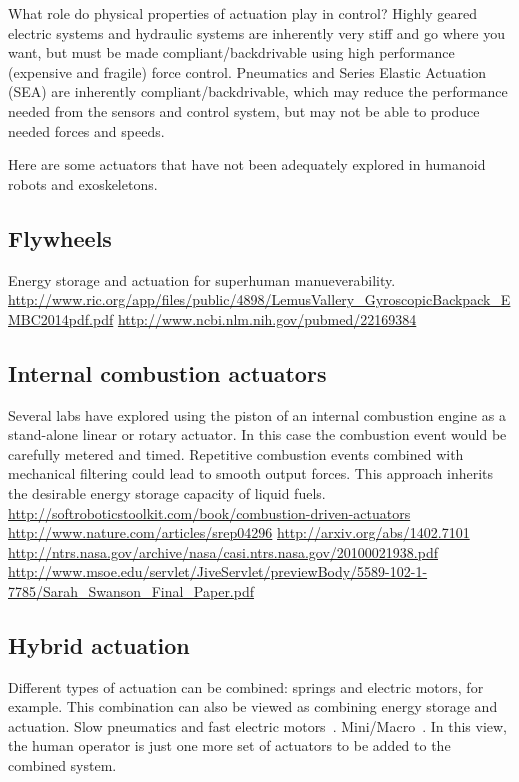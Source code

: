 \documentclass[letterpaper,12pt,fullpage]{article}
\begin{document}
What role do physical properties of actuation play in control? Highly
geared electric systems and hydraulic systems are inherently very
stiff and go where you want, but must be made compliant/backdrivable
using high performance (expensive and fragile) force control.
Pneumatics and Series Elastic Actuation (SEA) are inherently
compliant/backdrivable, which may reduce the performance
needed from the sensors and control system, but may not be able to
produce needed forces and speeds.

Here are some actuators
that have not been adequately explored
in humanoid robots and exoskeletons.

\subsection{Flywheels}

Energy storage and actuation for superhuman manueverability.
\url{http://www.ric.org/app/files/public/4898/LemusVallery_GyroscopicBackpack_EMBC2014pdf.pdf}
\url{http://www.ncbi.nlm.nih.gov/pubmed/22169384}


\subsection{Internal combustion actuators}

Several labs have explored using the piston of an internal combustion
engine as a stand-alone linear or rotary actuator. In this case
the combustion event would be carefully metered and timed. Repetitive
combustion events combined with mechanical filtering could lead to smooth
output forces. This approach inherits the desirable energy storage capacity
of liquid fuels. 
\url{http://softroboticstoolkit.com/book/combustion-driven-actuators}
\url{http://www.nature.com/articles/srep04296}
\url{http://arxiv.org/abs/1402.7101}
\url{http://ntrs.nasa.gov/archive/nasa/casi.ntrs.nasa.gov/20100021938.pdf}
\url{http://www.msoe.edu/servlet/JiveServlet/previewBody/5589-102-1-7785/Sarah_Swanson_Final_Paper.pdf}

\subsection{Hybrid actuation}

Different types of actuation can be combined: springs and electric motors,
for example. This combination can also be viewed as combining energy
storage and actuation. Slow pneumatics and fast electric motors~\cite{Morimoto,UCLA}.
Mini/Macro~\cite{Stanford}. In this view, the human operator is just
one more set of actuators to be added to the combined system.
\end{document}

